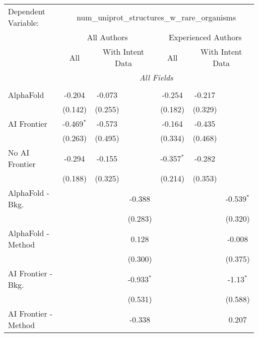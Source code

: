\begingroup
\centering
\begin{tabular}{lcccccc}
   \tabularnewline \midrule \midrule
   Dependent Variable: & \multicolumn{6}{c}{num\_uniprot\_structures\_w\_rare\_organisms}\\
 & \multicolumn{3}{c}{All Authors} & \multicolumn{3}{c}{Experienced Authors} \\
\cmidrule(lr){2-4} \cmidrule(lr){5-7}
 & \multicolumn{1}{c}{All} & \multicolumn{2}{c}{With Intent Data} & \multicolumn{1}{c}{All} & \multicolumn{2}{c}{With Intent Data} \\
\cmidrule(lr){2-2} \cmidrule(lr){3-4} \cmidrule(lr){5-5} \cmidrule(lr){6-7}
 & \multicolumn{6}{c}{\textit{All Fields}} \\ \\
   AlphaFold               & -0.204       & -0.073  &              & -0.254       & -0.217  &   \\   
                           & (0.142)      & (0.255) &              & (0.182)      & (0.329) &   \\   
   AI Frontier             & -0.469$^{*}$ & -0.573  &              & -0.164       & -0.435  &   \\   
                           & (0.263)      & (0.495) &              & (0.334)      & (0.468) &   \\   
   No AI Frontier          & -0.294       & -0.155  &              & -0.357$^{*}$ & -0.282  &   \\   
                           & (0.188)      & (0.325) &              & (0.214)      & (0.353) &   \\   
   AlphaFold - Bkg.        &              &         & -0.388       &              &         & -0.539$^{*}$\\   
                           &              &         & (0.283)      &              &         & (0.320)\\   
   AlphaFold - Method      &              &         & 0.128        &              &         & -0.008\\   
                           &              &         & (0.300)      &              &         & (0.375)\\   
   AI Frontier - Bkg.      &              &         & -0.933$^{*}$ &              &         & -1.13$^{*}$\\   
                           &              &         & (0.531)      &              &         & (0.588)\\   
   AI Frontier - Method    &              &         & -0.338       &              &         & 0.207\\   

\end{tabular}
